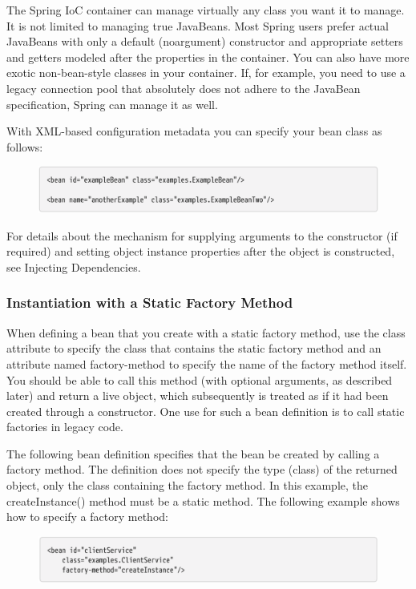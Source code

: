 The Spring IoC container can manage virtually any class you want it to manage. It is not limited to
managing true JavaBeans. Most Spring users prefer actual JavaBeans with only a default (noargument) constructor and appropriate setters and getters modeled after the properties in the
container. You can also have more exotic non-bean-style classes in your container. If, for example,
you need to use a legacy connection pool that absolutely does not adhere to the JavaBean
specification, Spring can manage it as well.

With XML-based configuration metadata you can specify your bean class as follows:

\begin{figure}[ht]
    \centering
    \includegraphics[width=1\linewidth]{./Figure/IMG_code_14.png}
\end{figure}

For details about the mechanism for supplying arguments to the constructor (if required) and
setting object instance properties after the object is constructed, see Injecting Dependencies.


\subsubsection{Instantiation with a Static Factory Method}
When defining a bean that you create with a static factory method, use the class attribute to specify
the class that contains the static factory method and an attribute named factory-method to specify
the name of the factory method itself. You should be able to call this method (with optional
arguments, as described later) and return a live object, which subsequently is treated as if it had
been created through a constructor. One use for such a bean definition is to call static factories in
legacy code.

The following bean definition specifies that the bean be created by calling a factory method. The
definition does not specify the type (class) of the returned object, only the class containing the
factory method. In this example, the createInstance() method must be a static method. The
following example shows how to specify a factory method:

\begin{figure}[ht]
    \centering
    \includegraphics[width=1\linewidth]{./Figure/IMG_code_15.png}
\end{figure}

